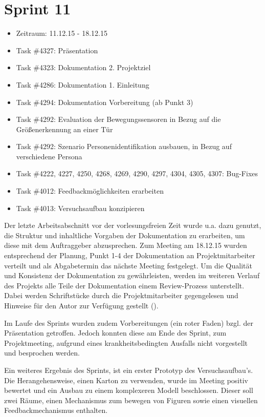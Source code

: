 \documentclass[12pt, oneside, smallheadings]{scrbook}
\begin{document}
\section{Sprint 11}
\begin{itemize}
	\item Zeitraum: 11.12.15 - 18.12.15 \newline
	\item Task \#4327: Präsentation
	\item Task \#4323: Dokumentation 2. Projektziel
	\item Task \#4286: Dokumentation 1. Einleitung
	\item Task \#4294: Dokumentation Vorbereitung (ab Punkt 3)
	\item Task \#4292: Evaluation der Bewegungssensoren in Bezug auf die Größenerkennung an einer Tür
	\item Task \#4292: Szenario Personenidentifikation ausbauen, in Bezug auf verschiedene Persona
	\item Task \#4222, 4227, 4250, 4268, 4269, 4290, 4297, 4304, 4305, 4307: Bug-Fixes
	\item Task \#4012: Feedbackmöglichkeiten erarbeiten
	\item Task \#4013: Versuchsaufbau konzipieren\\
\end{itemize}
\noindent
Der letzte Arbeitsabschnitt vor der vorlesungsfreien Zeit wurde u.a. dazu genutzt, die Struktur und inhaltliche Vorgaben der Dokumentation zu erarbeiten, um diese mit dem Auftraggeber abzusprechen. Zum Meeting am 18.12.15 wurden entsprechend der Planung, Punkt 1-4 der Dokumentation an Projektmitarbeiter verteilt und als Abgabetermin das nächste Meeting festgelegt. Um die Qualität und Konsistenz der Dokumentation zu gewährleisten, werden im weiteren Verlauf des Projekts alle Teile der Dokumentation einem Review-Prozess unterstellt. Dabei werden Schriftstücke durch die Projektmitarbeiter gegengelesen und Hinweise für den Autor zur Verfügung gestellt ().

Im Laufe des Sprints wurden zudem Vorbereitungen (ein roter Faden) bzgl. der Präsentation getroffen. Jedoch konnten diese am Ende des Sprint, zum Projektmeeting, aufgrund eines krankheitsbedingten Ausfalls nicht vorgestellt und besprochen werden. 

Ein weiteres Ergebnis des Sprints, ist ein erster Prototyp des Versuchsaufbau's. Die Herangehensweise, einen Karton zu verwenden, wurde im Meeting positiv bewertet und ein Ausbau zu einem komplexeren Modell beschlossen. Dieser soll zwei Räume, einen Mechanismus zum bewegen von Figuren sowie einen visuellen Feedbackmechanismus enthalten.
\end{document}
